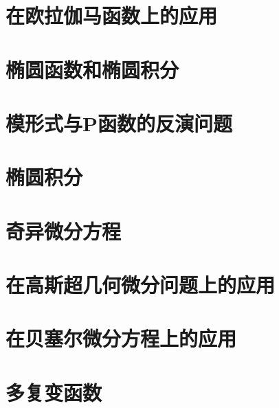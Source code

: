 \section{在欧拉伽马函数上的应用}
\section{椭圆函数和椭圆积分}
\section{模形式与P函数的反演问题}
\section{椭圆积分}
\section{奇异微分方程}
\section{在高斯超几何微分问题上的应用}
\section{在贝塞尔微分方程上的应用}
\section{多复变函数}


